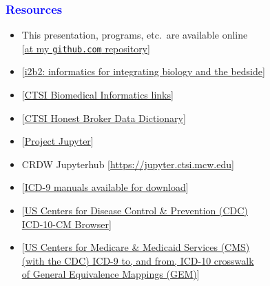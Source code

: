 \documentclass[11pt,pdftex,dvipsnames,usenames]{beamer}
\begin{document}
\begin{frame}[fragile]\frametitle{\bf\textcolor{blue}{Resources}}

\begin{itemize}
\item This presentation, programs, etc.\ are available online\\
\textcolor{PineGreen}{[\href{https://github.com/rsparapa/CTSI/tree/main/Summer25}{at my \texttt{github.com} repository}]}
\item \textcolor{PineGreen}{[\href{https://www.i2b2.org}
{i2b2: informatics for integrating biology and the bedside}]}
\item \textcolor{PineGreen}{[\href{https://ctsi.mcw.edu/data-science-informatics/cbmi/crdw/bmi-resource-links}
{CTSI Biomedical Informatics links}]}
\item \textcolor{PineGreen}{[\href{https://share.ctsi.mcw.edu/s/8gj39XFxP9oeGGY}{CTSI Honest Broker Data Dictionary}]}
\item \textcolor{PineGreen}{[\href{https://en.wikipedia.org/wiki/Project_Jupyter}{Project Jupyter}]}
\item CRDW Jupyterhub \textcolor{PineGreen}{[\href{https://jupyter.ctsi.mcw.edu}{https://jupyter.ctsi.mcw.edu}]}
\item \textcolor{PineGreen}{[\href{https://www.cdc.gov/nchs/icd/icd9cm.htm}
{ICD-9 manuals available for download}]}
\item \textcolor{PineGreen}{[\href{https://icd10cmtool.cdc.gov}
{US Centers for Disease Control \& Prevention (CDC)\\ 
ICD-10-CM Browser}]}
\item \textcolor{PineGreen}{[\href{https://www.nber.org/research/data/icd-9-cm-and-icd-10-cm-and-icd-10-pcs-crosswalk-or-general-equivalence-mappings}
{US Centers for Medicare \& Medicaid Services (CMS) \\
(with the CDC) ICD-9 to, and from, ICD-10 crosswalk \\
of General Equivalence Mappings (GEM)}]}
\end{itemize}

\end{frame}
\end{document}
